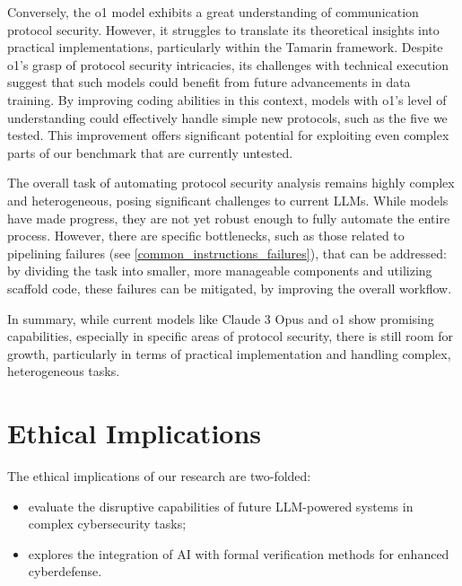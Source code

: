 Conversely, the o1 model exhibits a great understanding of communication protocol security. However, it struggles to translate its theoretical insights into practical implementations, particularly within the Tamarin framework. Despite o1's grasp of protocol security intricacies, its challenges with technical execution suggest that such models could benefit from future advancements in data training. By improving coding abilities in this context, models with o1's level of understanding could effectively handle simple new protocols, such as the five we tested. This improvement offers significant potential for exploiting even complex parts of our benchmark that are currently untested.

The overall task of automating protocol security analysis remains highly complex and heterogeneous, posing significant challenges to current LLMs. While models have made progress, they are not yet robust enough to fully automate the entire process. However, there are specific bottlenecks, such as those related to pipelining failures (see \ref{common_instructions_failures}), that can be addressed: by dividing the task into smaller, more manageable components and utilizing scaffold code, these failures can be mitigated, by improving the overall workflow.

In summary, while current models like Claude 3 Opus and o1 show promising capabilities, especially in specific areas of protocol security, there is still room for growth, particularly in terms of practical implementation and handling complex, heterogeneous tasks.

\section{Ethical Implications}
\label{sec:ethicalimplications}
The ethical implications of our research are two-folded:
\begin{itemize}
    \item evaluate the disruptive capabilities of future LLM-powered systems in complex cybersecurity tasks;
    \item explores the integration of AI with formal verification methods for enhanced cyberdefense.
\end{itemize}  

